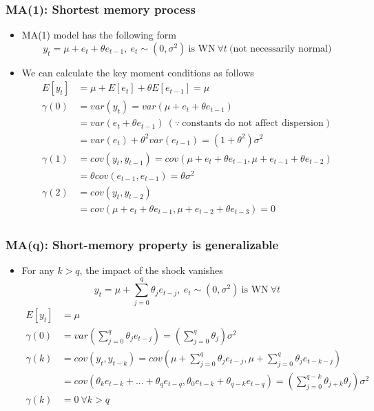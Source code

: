 \documentclass[aspectratio=169]{beamer}
\begin{document}
\begin{frame}
\frametitle{MA(1): Shortest memory process}
\begin{itemize}
\item  MA(1) model has the following form
\[
y_t = \mu+ e_t + \theta e_{t-1}, \ e_t \sim (0,\sigma^2) \ \text{is WN}\ \forall t \ \text{(not necessarily normal)}
\]
\item We can calculate the key moment conditions as follows
\[
\begin{aligned}
E[y_t]&=\mu+E[e_t]+\theta E[e_{t-1}]=\mu\\
\gamma(0)&=var(y_t)=var(\mu+ e_t + \theta e_{t-1})\\
&=var(e_t + \theta e_{t-1}) \ (\because \ \text{constants do not affect dispersion})\\
&=var(e_t) + \theta^2 var(e_{t-1})=(1+\theta^2)\sigma^2\\
\gamma(1)&=cov(y_t,y_{t-1})=cov(\mu+ e_t + \theta e_{t-1},\mu+ e_{t-1} + \theta e_{t-2})\\
&=\theta cov(e_{t-1},e_{t-1})=\theta\sigma^2\\
\gamma(2)&=cov(y_t,y_{t-2})\\
&=cov(\mu+ e_t + \theta e_{t-1},\mu+ e_{t-2} + \theta e_{t-3})=0\\
\end{aligned}
\]
\end{itemize}
\end{frame}

\begin{frame}
\frametitle{MA(q): Short-memory property is generalizable}
\begin{itemize}
\item For any $k>q$, the impact of the shock vanishes
\[
y_t = \mu+ \sum_{j=0}^q \theta_j e_{t-j}, \ e_t \sim (0,\sigma^2) \ \text{is WN}\ \forall t 
\]
\small{\[
\begin{aligned}
E[y_t]&=\mu\\
\gamma(0)&=var\left(\sum_{j=0}^q \theta_j e_{t-j}\right)=\left(\sum_{j=0}^q \theta_j\right)\sigma^2\\
\gamma(k)&=cov(y_t,y_{t-k})=cov\left(\mu+ \sum_{j=0}^q \theta_j e_{t-j},\mu+  \sum_{j=0}^q \theta_j e_{t-k-j}\right)\\
&=cov\left(\theta_ke_{t-k}+...+\theta_qe_{t-q}, \theta_0e_{t-k}+\theta_{q-k}e_{t-q}\right)=\left(\sum_{j=0}^{q-k}\theta_{j+k}\theta_j\right)\sigma^2\\
\gamma(k)&=0 \ \forall k>q
\end{aligned}
\]}
\end{itemize}
\end{frame}
\end{document}
